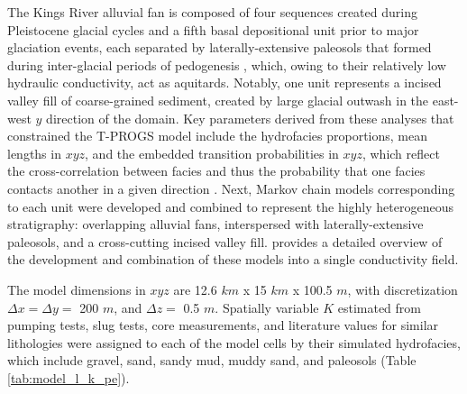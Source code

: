 The Kings River alluvial fan is composed of four sequences created during Pleistocene glacial cycles and a fifth basal depositional unit prior to major glaciation events, each separated by laterally-extensive paleosols that formed during inter-glacial periods of pedogenesis \citep{weissmann2002glacially}, which, owing to their relatively low hydraulic conductivity, act as aquitards. Notably, one unit represents a incised valley fill of coarse-grained sediment, created by large glacial outwash in the east-west $y$ direction of the domain. Key parameters derived from these analyses that constrained the T-PROGS model include the hydrofacies proportions, mean lengths in $xyz$, and the embedded transition probabilities in $xyz$, which reflect the cross-correlation between facies and thus the probability that one facies contacts another in a given direction \citep{carle1996transition}. Next, Markov chain models corresponding to each unit were developed and combined to represent the highly heterogeneous stratigraphy: overlapping alluvial fans, interspersed with laterally-extensive paleosols, and a cross-cutting incised valley fill. \citet{weissmann2004influence} provides a detailed overview of the development and combination of these models into a single conductivity field. 

The model dimensions in $xyz$ are 12.6 $km$ x 15 $km$ x 100.5 $m$, with discretization $\Delta x = \Delta y = $ 200 $m$, and $\Delta z =$ 0.5 $m$. Spatially variable $K$ estimated from pumping tests, slug tests, core measurements, and literature values for similar lithologies \citep{burow1999evaluation, weissmann1999three} were assigned to each of the model cells by their simulated hydrofacies, which include gravel, sand, sandy mud, muddy sand, and paleosols (Table \ref{tab:model_l_k_pe}).


